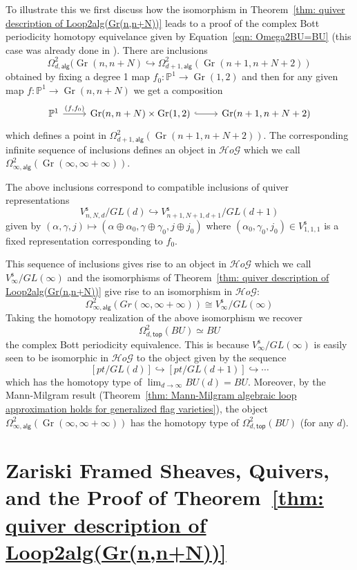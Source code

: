 \documentclass{amsart}
\theoremstyle{definition}
\newcommand{\HoG}{\mathcal{H}o\mathcal{G}}    %
\newcommand{\PP}{\mathbb{P}}
\newcommand{\alg}{\mathsf{alg}}
\newcommand{\stable}{\mathsf{s}}
\renewcommand{\top}{\mathsf{top}}
\newcommand{\Gr}{\operatorname{Gr}}
\newcommand{\LoopTwo}{\Omega^{2}_{d,\alg}}
\newcommand{\LoopTwoTop}{\Omega^{2}_{d,\top}}
\newcommand{\homotopyeq}{\simeq}
\begin{document}
To illustrate this we first discuss how the isomorphism in
Theorem~\ref{thm: quiver description of Loop2alg(Gr(n,n+N))} leads to
a proof of the complex Bott periodicity homotopy equivelance given by
Equation~\eqref{eqn: Omega2BU=BU} (this case was already done in
\cite{Larson-Vakil-BottPeriodicity}). There are inclusions
\[
\LoopTwo (\Gr (n, n+N) \hookrightarrow \Omega^{2}_{d+1,\alg}(\Gr (n+1,n+N+2))
\]
obtained by fixing a degree 1 map $f_{0}:\PP^{1} \to \Gr (1,2)$ and
then for any given map $f:\PP^{1}\to \Gr (n,n+N)$ we get a composition
\[
\begin{tikzcd}
\PP^{1} \arrow[r, "{(f,f_{0})}"] & \Gr (n,n+N)\times \Gr (1,2)
\arrow[r, hook, ""] & \Gr (n+1,n+N+2)
\end{tikzcd}
\]
which defines a point in $\Omega^{2}_{d+1,\alg}(\Gr (n+1,n+N+2))$. The
corresponding infinite sequence of inclusions defines an object in
$\HoG$ which we call $\Omega^{2}_{\infty,\alg }(\Gr (\infty ,\infty +\infty
))$.

The above inclusions correspond to compatible inclusions of quiver
representations
\[
V^{\stable}_{n,N,d}/GL(d) \hookrightarrow
V^{\stable}_{n+1,N+1,d+1}/GL(d+1) 
\]
given by $(\alpha ,\gamma ,j)\mapsto (\alpha \oplus \alpha_{0},\gamma
\oplus \gamma_{0},j\oplus j_{0})$ where
$(\alpha_{0},\gamma_{0},j_{0})\in V^{\stable}_{1,1,1}$ is a fixed
representation corresponding to $f_{0}$. 

This sequence of inclusions gives rise to an object in $\HoG$ which we
call $V^{\stable}_{\infty} / GL(\infty )$ and the isomorphisms of
Theorem~\ref{thm: quiver description of Loop2alg(Gr(n,n+N))} give rise
to an isomorphism in $\HoG$:
\[
\Omega^{2}_{\infty ,\alg}(Gr(\infty ,\infty +\infty ))\cong
V^{\stable}_{\infty} / GL(\infty ) 
\]
Taking the homotopy realization of the above isomorphism we recover
\[
\LoopTwoTop (BU)\homotopyeq BU
\]
the complex Bott periodicity equivalence. This is because
$V^{\stable}_{\infty} / GL(\infty )$ is easily seen to be isomorphic
in $\HoG$ to the object given by the sequence
\[
[pt/GL(d)]\hookrightarrow [pt/GL(d+1)]\hookrightarrow \dotsb 
\]
which has the homotopy type of $\lim_{d\to \infty}BU(d) =
BU$. Moreover,  by
the Mann-Milgram result (Theorem~\ref{thm: Mann-Milgram algebraic loop
approximation holds for generalized flag varieties}), the object
$\Omega^{2}_{\infty ,\alg}(\Gr (\infty ,\infty +\infty ))$ has the
homotopy type of $\LoopTwoTop (BU)$ (for any $d$).



\section{Zariski Framed Sheaves, Quivers, and the Proof of
Theorem~\ref{thm: quiver description of
Loop2alg(Gr(n,n+N))}}\label{sec: Zariski framed sheaves, quivers, and
proof of Loop2(Gr) theorem}
\end{document}
